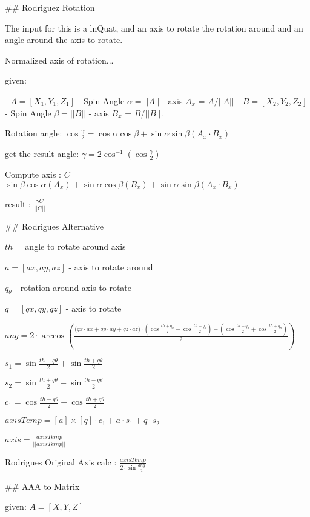 ## Rodriguez Rotation

The input for this is a lnQuat, and an axis to rotate the rotation around and an angle around the axis to rotate.

Normalized axis of rotation...

given: 

- ${A} = [X_1, Y_1 ,Z_1] $   
  - Spin Angle $\alpha = ||A||$
  - axis $A_x$ = $A/||A||$
- ${B} = [X_2, Y_2 ,Z_2] $  
  - Spin Angle $\beta = ||B||$
  - axis $B_x$ = $B/||B||$.

Rotation angle: $\cos \frac{\gamma}{2} = \cos \alpha   \cos \beta  + \sin \alpha    \sin \beta  (  A_x \cdot B_x )$

get the result angle: $ \gamma = 2 \cos^{-1}( \cos \frac {\gamma}{2} )$


Compute axis : $C$ = $  \sin \beta  \cos \alpha  (A_x)  + \sin \alpha  \cos \beta (B_x) + \sin \alpha \sin \beta  ( A_x \cdot B_x ) $

result : $\frac {\gamma C} {||C||}$

## Rodrigues Alternative 

$th$ = angle to rotate around axis

$a = [ax,ay,az]$ - axis to rotate around

$q_{\theta}$ - rotation around axis to rotate

$ q = [qx,qy,qz]$ - axis to rotate

${ang} = 2 \cdot \arccos  ( \frac { ({{qx} \cdot {ax}+{qy}\cdot{ay}+{qz}\cdot{az})}\cdot({\cos {\frac {{th} + {q_\theta}} 2}}-{\cos {\frac {{th} - {q_\theta}} 2}}) + ( {\cos {\frac {{th} - {q_\theta}} 2}} + {\cos {\frac {{th} + {q_\theta}} 2}} ) } 2   )$

${s_1} = {\sin {\frac {{th} - {q\theta}} 2}} + {\sin {\frac {{th} + {q\theta}} 2}} $

${s_2} = {\sin {\frac {{th} + {q\theta}} 2}} - {\sin {\frac {{th} - {q\theta}} 2}} $

${c_1} = {\cos {\frac {{th} - {q\theta}} 2}} - {\cos {\frac {{th} + {q\theta}} 2}} $

${axisTemp} = {[{a}] \times [{q}]}\cdot {c_1} + {a}\cdot{s_1} + {q}\cdot{s_2} $

${axis} = \frac {axisTemp} { ||{axisTemp}|| } $

Rodrigues Original Axis calc : $\frac {axisTemp} {2 \cdot \sin  \frac {ang} 2 } $



## AAA to Matrix

given: ${A} = [X, Y ,Z] $

